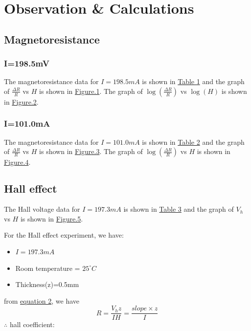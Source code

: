 \section{Observation \& Calculations}
    \subsection{Magnetoresistance}
    
        \subsubsection{I=198.5mV}
            The magnetoresistance data for $I=198.5mA$ is shown in \hyperref[tab:mag1]{Table 1} and the graph of $\frac{\Delta R}{R}$ vs $H$ is shown in \hyperref[fig:graph1]{Figure.1}. The graph of $\log (\frac{\Delta R}{R})$  vs $\log(H)$ is shown in \hyperref[fig:graph2]{Figure.2}.


        \subsubsection{I=101.0mA}
            The magnetoresistance data for $I=101.0mA$ is shown in \hyperref[tab:mag2]{Table 2} and the graph of $\frac{\Delta R}{R}$ vs $H$ is shown in \hyperref[fig:graph3]{Figure.3}. The graph of $\log(\frac{\Delta R}{R})$ vs $H$ is shown in \hyperref[fig:graph4]{Figure.4}.

    \subsection{Hall effect}
        The Hall voltage data for $I=197.3mA$ is shown in \hyperref[tab:hall1]{Table 3} and the graph of $V_h$ vs $H$ is shown in \hyperref[fig:graph6]{Figure.5}. 

        For the Hall effect experiment, we have:
        \begin{itemize}
            \item $I = 197.3mA$
            \item Room temperature = $25^{\circ}C$
            \item Thickness(z)=0.5mm
        \end{itemize}

        from \hyperref[eqn:2]{equation 2}, we have\\
        $$R = \frac{V_hz}{IH} = \frac{slope\times z}{I}$$
        $\therefore$ hall coefficient:





